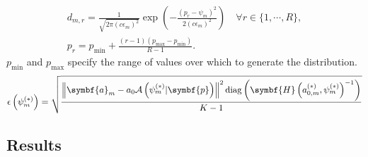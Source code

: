 \begin{subequations}
    \begin{gather}
        d_{m,r} = \frac{1}{\sqrt{2 \pi (c \epsilon_m)^2}}
        \exp\left(
            - \frac{(p_r - \psi_m)^2}{2 (c \epsilon_m)^2}
        \right)\quad \forall r \in \lbrace 1, \cdots, R \rbrace,\\
        p_r = p_{\text{min}} + \frac{(r-1) (p_{\text{max}} - p_{\text{min}})}{R-1}.
    \end{gather}
    \label{eq:distribution}%
\end{subequations}
$p_{\text{min}}$ and $p_{\text{max}}$ specify the range of values over which to
generate the distribution.
\label{corr:seq-errors}
\begin{equation}
    \epsilon\left(\psi_m^{(*)}\right) = \sqrt{
        \frac{
            \left\lVert \symbf{a}_m - a_0 \mathcal{A}\left(\psi_m^{(*)} \vert \symbf{p}\right) \right\rVert^2
            \diag \left(\symbf{H}\left(a_{0,m}^{(*)}, \psi_m^{(*)}\right)^{-1}\right)
        }
        {K-1}
    }
\end{equation}


\subsection{Results}
\label{subsec:seq-results}
